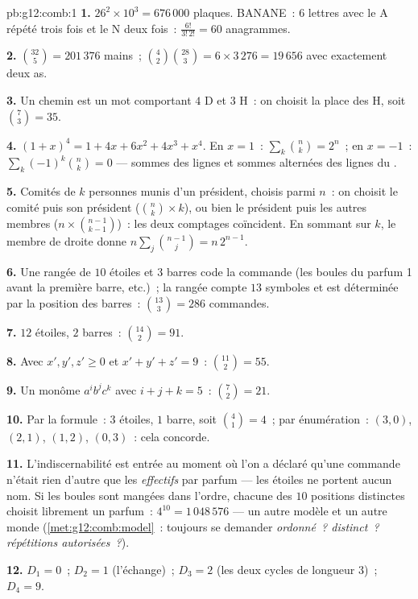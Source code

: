 \begin{solution}{pb:g12:comb:1}
\textbf{1.} $26^2 \times 10^3 = 676\,000$ plaques. BANANE~: $6$
lettres avec le A répété trois fois et le N deux fois~:
$\frac{6!}{3!\,2!} = 60$ anagrammes.

\textbf{2.} $\binom{32}{5} = 201\,376$ mains~;
$\binom42 \binom{28}{3} = 6 \times 3\,276 = 19\,656$ avec
exactement deux as.

\textbf{3.} Un chemin est un mot comportant $4$ D et $3$ H~: on
choisit la place des H, soit $\binom73 = 35$.

\textbf{4.} $(1+x)^4 = 1 + 4x + 6x^2 + 4x^3 + x^4$. En $x = 1$~:
$\sum_k \binom nk = 2^n$~; en $x = -1$~:
$\sum_k (-1)^k \binom nk = 0$ --- sommes des lignes et sommes
alternées des lignes du .

\textbf{5.} Comités de $k$ personnes munis d'un président, choisis
parmi $n$~: on choisit le comité puis son président
($\binom nk \times k$), ou bien le président puis les autres membres
($n \times \binom{n-1}{k-1}$)~: les deux comptages coïncident. En
sommant sur $k$, le membre de droite donne
$n \sum_j \binom{n-1}{j} = n\,2^{n-1}$.

\textbf{6.} Une rangée de $10$ étoiles et $3$ barres code la
commande (les boules du parfum 1 avant la première barre, etc.)~; la
rangée compte $13$ symboles et est déterminée par la position des
barres~: $\binom{13}{3} = 286$ commandes.

\textbf{7.} $12$ étoiles, $2$ barres~: $\binom{14}{2} = 91$.

\textbf{8.} Avec $x', y', z' \geq 0$ et $x' + y' + z' = 9$~:
$\binom{11}{2} = 55$.

\textbf{9.} Un monôme $a^i b^j c^k$ avec $i + j + k = 5$~:
$\binom72 = 21$.

\textbf{10.} Par la formule~: $3$ étoiles, $1$ barre, soit
$\binom41 = 4$~; par énumération~: $(3,0)$, $(2,1)$, $(1,2)$,
$(0,3)$~: cela concorde.

\textbf{11.} L'indiscernabilité est entrée au moment où l'on a
déclaré qu'une commande n'était rien d'autre que les
\emph{effectifs} par parfum --- les étoiles ne portent aucun nom. Si
les boules sont mangées dans l'ordre, chacune des $10$ positions
distinctes choisit librement un parfum~: $4^{10} = 1\,048\,576$
 --- un autre modèle et un autre monde
(\cref{met:g12:comb:model}~: toujours se demander \emph{ordonné~?
distinct~? répétitions autorisées~?}).

\textbf{12.} $D_1 = 0$~; $D_2 = 1$ (l'échange)~; $D_3 = 2$ (les
deux cycles de longueur $3$)~; $D_4 = 9$.


\end{solution}
